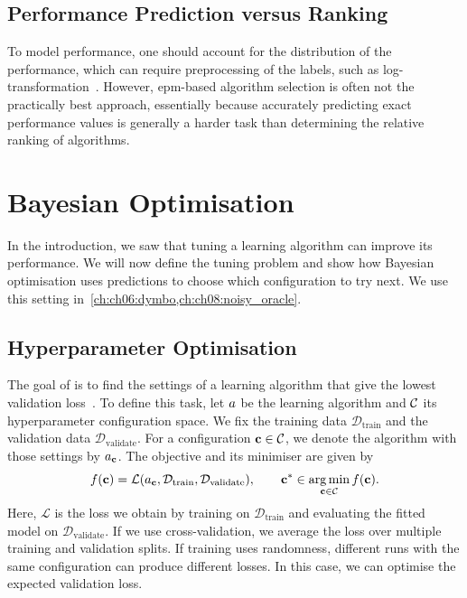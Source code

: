 \subsection{Performance Prediction versus Ranking}

To model performance, one should account for the distribution of the performance, which can require preprocessing of the labels, such as log-transformation~\citep{HutEtAl14}. However, \gls{epm}-based algorithm selection is often not the practically best approach, essentially because accurately predicting exact performance values is generally a harder task than determining the relative ranking of algorithms.

\section{Bayesian Optimisation}
\label{sec:ch02:bayesian_optimisation}

In the introduction, we saw that tuning a learning algorithm can improve its performance. We will now define the tuning problem and show how Bayesian optimisation uses predictions to choose which configuration to try next. We use this setting in~\cref{ch:ch06:dymbo,ch:ch08:noisy_oracle}.

\subsection{Hyperparameter Optimisation}
\label{sec:ch02:hpo}

The goal of  is to find the settings of a learning algorithm that give the lowest validation loss~\citep{BisEtAl23}. To define this task, let $a$ be the learning algorithm and $\mathcal{C}$ its hyperparameter configuration space. We fix the training data $\mathcal D_{\mathrm{train}}$ and the validation data $\mathcal D_{\mathrm{validate}}$. For a configuration $\mathbf{c}\in\mathcal{C}$, we denote the algorithm with those settings by $a_{\mathbf{c}}$. The objective and its minimiser are given by
\begin{equation}
\label{eq:ch02:def-hpo}
    f(\mathbf{c}) =
    \mathcal L(a_{\mathbf{c}},\mathcal D_{\mathrm{train}},
    \mathcal D_{\mathrm{validate}}),
    \qquad
    \mathbf{c}^* \in \operatorname*{arg\,min}_{\mathbf{c}\in\mathcal{C}}
    f(\mathbf{c}).
\end{equation}
Here, $\mathcal L$ is the loss we obtain by training on $\mathcal D_{\mathrm{train}}$ and evaluating the fitted model on $\mathcal D_{\mathrm{validate}}$. If we use cross-validation, we average the loss over multiple training and validation splits. If training uses randomness, different runs with the same configuration can produce different losses. In this case, we can optimise the expected validation loss.

